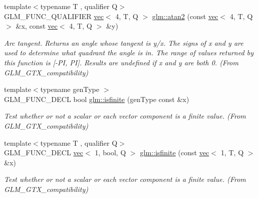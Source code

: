 \begin{DoxyCompactItemize}
\mbox{\label{group__gtx__compatibility_gaba86c28da7bf5bdac64fecf7d56e8ff3}} 
{\footnotesize template$<$typename T , qualifier Q$>$ }\\G\+L\+M\+\_\+\+F\+U\+N\+C\+\_\+\+Q\+U\+A\+L\+I\+F\+I\+ER \hyperlink{structglm_1_1vec}{vec}$<$ 4, T, Q $>$ \hyperlink{group__gtx__compatibility_gaba86c28da7bf5bdac64fecf7d56e8ff3}{glm\+::atan2} (const \hyperlink{structglm_1_1vec}{vec}$<$ 4, T, Q $>$ \&x, const \hyperlink{structglm_1_1vec}{vec}$<$ 4, T, Q $>$ \&y)
\begin{DoxyCompactList}\small\item\em Arc tangent. Returns an angle whose tangent is y/x. The signs of x and y are used to determine what quadrant the angle is in. The range of values returned by this function is \mbox{[}-\/\+PI, PI\mbox{]}. Results are undefined if x and y are both 0. (From G\+L\+M\+\_\+\+G\+T\+X\+\_\+compatibility) \end{DoxyCompactList}\item 
\mbox{\label{group__gtx__compatibility_gaf4b04dcd3526996d68c1bfe17bfc8657}} 
{\footnotesize template$<$typename gen\+Type $>$ }\\G\+L\+M\+\_\+\+F\+U\+N\+C\+\_\+\+D\+E\+CL bool \hyperlink{group__gtx__compatibility_gaf4b04dcd3526996d68c1bfe17bfc8657}{glm\+::isfinite} (gen\+Type const \&x)
\begin{DoxyCompactList}\small\item\em Test whether or not a scalar or each vector component is a finite value. (From G\+L\+M\+\_\+\+G\+T\+X\+\_\+compatibility) \end{DoxyCompactList}\item 
\mbox{\label{group__gtx__compatibility_gac3b12b8ac3014418fe53c299478b6603}} 
{\footnotesize template$<$typename T , qualifier Q$>$ }\\G\+L\+M\+\_\+\+F\+U\+N\+C\+\_\+\+D\+E\+CL \hyperlink{structglm_1_1vec}{vec}$<$ 1, bool, Q $>$ \hyperlink{group__gtx__compatibility_gac3b12b8ac3014418fe53c299478b6603}{glm\+::isfinite} (const \hyperlink{structglm_1_1vec}{vec}$<$ 1, T, Q $>$ \&x)
\begin{DoxyCompactList}\small\item\em Test whether or not a scalar or each vector component is a finite value. (From G\+L\+M\+\_\+\+G\+T\+X\+\_\+compatibility) \end{DoxyCompactList}\item 

\end{DoxyCompactItemize}

